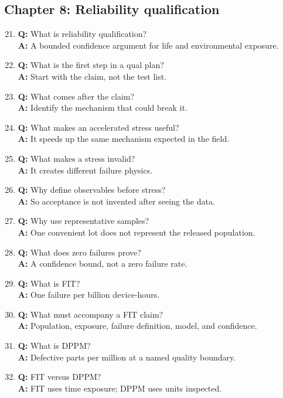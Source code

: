 \subsection{Chapter 8: Reliability qualification}
\begin{enumerate}
\setcounter{enumi}{20}
\item \textbf{Q:} What is reliability qualification?\\
\textbf{A:} A bounded confidence argument for life and environmental exposure.
\item \textbf{Q:} What is the first step in a qual plan?\\
\textbf{A:} Start with the claim, not the test list.
\item \textbf{Q:} What comes after the claim?\\
\textbf{A:} Identify the mechanism that could break it.
\item \textbf{Q:} What makes an accelerated stress useful?\\
\textbf{A:} It speeds up the same mechanism expected in the field.
\item \textbf{Q:} What makes a stress invalid?\\
\textbf{A:} It creates different failure physics.
\item \textbf{Q:} Why define observables before stress?\\
\textbf{A:} So acceptance is not invented after seeing the data.
\item \textbf{Q:} Why use representative samples?\\
\textbf{A:} One convenient lot does not represent the released population.
\item \textbf{Q:} What does zero failures prove?\\
\textbf{A:} A confidence bound, not a zero failure rate.
\item \textbf{Q:} What is FIT?\\
\textbf{A:} One failure per billion device-hours.
\item \textbf{Q:} What must accompany a FIT claim?\\
\textbf{A:} Population, exposure, failure definition, model, and confidence.
\item \textbf{Q:} What is DPPM?\\
\textbf{A:} Defective parts per million at a named quality boundary.
\item \textbf{Q:} FIT versus DPPM?\\
\textbf{A:} FIT uses time exposure; DPPM uses units inspected.

\end{enumerate}
